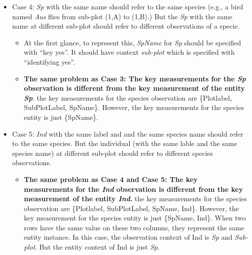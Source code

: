\documentclass[10pt]{article}
\begin{document}
\begin{itemize}
\begin{itemize}
{The key measurements for the treatment observation is different from the key measurement  of the entity treatment}. 
After considering the context, the key measurements for the treatment observation are \{Plotlabel, SubPlotLabel, TmntType\}.  
When two rows have the same value on these measurements, they represent the same observation instance.
However, the key measurement for the treatment entity is just \{TmntType\}. When two rows have the same value on it, they represent the same entity instance. 
The {\em identifying} constraint can only capture the observation context. 
{\bf This problem is more obvious when we analyze Case 5}. 
\item Another different annotation may be applied to catch this semantic. E.g., treat the {\em treatments} in different rows as different entity instances. 
This way, the observation type and the entity type have the same key measurement types \{Plotlabel, SubPlotLabel, TmntType\}. 
However, this problem still exists for Case 4 and Case 5. 
\end{itemize}

\item Case 4:  {\em Sp} with the same name should refer to the same species (e.g., a bird named {\em Aus} flies from sub-plot (1,A) to (1,B).)  
But the {\em Sp} with the same name at different sub-plot should refer to different observations of a specie.
\begin{itemize}
\item At the first glance, to represent this, {\em SpName} for {\em Sp} should be specified with ``key yes''. 
It should have context {\em sub-plot} which is specified with ``identifying yes''. 
\item {\bf The same problem as Case 3: The key measurements for the {\em Sp} observation is different from the key measurement  of the entity {\em Sp}}.
the key measurements for the species observation are \{Plotlabel, SubPlotLabel, SpName\}. 
However, the key measurements for the species entity is just \{SpName\}. 
\end{itemize} 

\item Case 5:  {\em Ind} with the same label and and the same species name should refer to the same species.
But the individual (with the same lable and the same species name) at different sub-plot should refer to different species observations.
\begin{itemize}
\item {\bf The same problem as Case 4 and Case 5: The key measurements for the {\em Ind} observation is different from the key measurement  of the entity {\em Ind}.}
the key measurements for the species observation are \{Plotlabel, SubPlotLabel, SpName, Ind\}. 
However, the key measurement for the species entity is just \{SpName, Ind\}.  When two rows have the same value on these two columns, they represent the same entity instance. 
In this case, the observation context of Ind is {\em Sp} and {\em Sub-plot}. But the entity context of Ind is just {\em Sp}. 
\end{itemize} 

\end{itemize}
\end{document}
